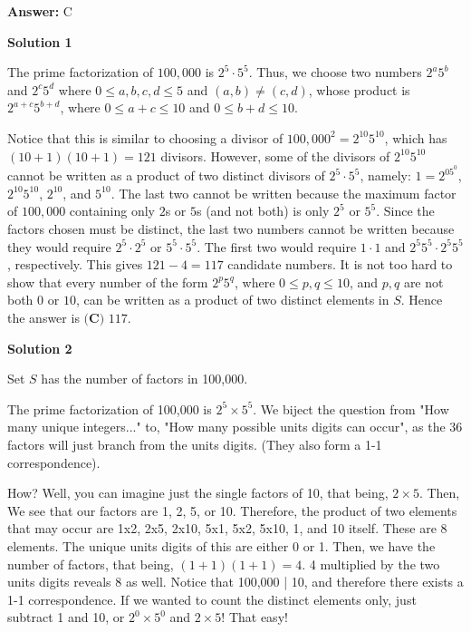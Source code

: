 \begin{enumerate}
 \textbf{Answer: }C



\textbf{Solution 1}

The prime factorization of $100,000$ is $2^5 \cdot 5^5$. Thus, we choose two numbers $2^a5^b$ and $2^c5^d$ where $0 \le a,b,c,d \le 5$ and $(a,b) \neq (c,d)$, whose product is $2^{a+c}5^{b+d}$, where $0 \le a+c \le 10$ and $0 \le b+d \le 10$.

 Notice that this is similar to choosing a divisor of $100,000^2 = 2^{10}5^{10}$, which has $(10+1)(10+1) = 121$ divisors. However, some of the divisors of $2^{10}5^{10}$ cannot be written as a product of two distinct divisors of $2^5 \cdot 5^5$, namely: $1 = 2^05^0$, $2^{10}5^{10}$, $2^{10}$, and $5^{10}$. The last two cannot be written because the maximum factor of $100,000$ containing only $2$s or $5$s (and not both) is only $2^5$ or $5^5$. Since the factors chosen must be distinct, the last two numbers cannot be written because they would require $2^5 \cdot 2^5$ or $5^5 \cdot 5^5$. The first two would require $1 \cdot 1$ and $2^{5}5^{5} \cdot 2^{5}5^{5}$, respectively. This gives $121-4 = 117$ candidate numbers. It is not too hard to show that every number of the form $2^p5^q$, where $0 \le p, q \le 10$, and $p,q$ are not both $0$ or $10$, can be written as a product of two distinct elements in $S$. Hence the answer is $\boxed{\textbf{(C) } 117}$.

 



\textbf{Solution 2}

Set \( S \) has the number of factors in 100,000. 

 The prime factorization of 100,000 is \( 2^5 \times 5^5 \). We biject the question from "How many unique integers..." to, "How many possible units digits can occur", as the 36 factors will just branch from the units digits. (They also form a 1-1 correspondence).

 How? Well, you can imagine just the single factors of 10, that being, \( 2 \times 5 \). Then, We see that our factors are 1, 2, 5, or 10. Therefore, the product of two elements that may occur are 1x2, 2x5, 2x10, 5x1, 5x2, 5x10, 1, and 10 itself. These are 8 elements. The unique units digits of this are either 0 or 1. Then, we have the number of factors, that being, \( (1+1)(1+1) = 4 \). 4 multiplied by the two units digits reveals 8 as well. Notice that 100,000 | 10, and therefore there exists a 1-1 correspondence. If we wanted to count the distinct elements only, just subtract 1 and 10, or \( 2^0 \times 5^0 \) and \( 2 \times 5 \)! That easy!


\end{enumerate}
